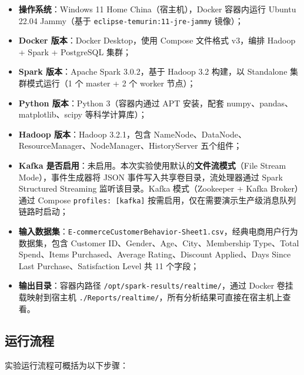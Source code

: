 \documentclass[12pt,hyperref,a4paper,UTF8]{ctexart}
\begin{document}
\begin{itemize}
    \item \textbf{操作系统}：Windows 11 Home China（宿主机），Docker 容器内运行 Ubuntu 22.04 Jammy（基于 \texttt{eclipse-temurin:11-jre-jammy} 镜像）；
    \item \textbf{Docker 版本}：Docker Desktop，使用 Compose 文件格式 v3，编排 Hadoop + Spark + PostgreSQL 集群；
    \item \textbf{Spark 版本}：Apache Spark 3.0.2，基于 Hadoop 3.2 构建，以 Standalone 集群模式运行（1 个 master + 2 个 worker 节点）；
    \item \textbf{Python 版本}：Python 3（容器内通过 APT 安装，配套 numpy、pandas、matplotlib、scipy 等科学计算库）；
    \item \textbf{Hadoop 版本}：Hadoop 3.2.1，包含 NameNode、DataNode、ResourceManager、NodeManager、HistoryServer 五个组件；
    \item \textbf{Kafka 是否启用}：未启用。本次实验使用默认的\textbf{文件流模式}（File Stream Mode），事件生成器将 JSON 事件写入共享卷目录，流处理器通过 Spark Structured Streaming 监听该目录。Kafka 模式（Zookeeper + Kafka Broker）通过 Compose \texttt{profiles: [kafka]} 按需启用，仅在需要演示生产级消息队列链路时启动；
    \item \textbf{输入数据集}：\texttt{E-commerceCustomerBehavior-Sheet1.csv}，经典电商用户行为数据集，包含 Customer ID、Gender、Age、City、Membership Type、Total Spend、Items Purchased、Average Rating、Discount Applied、Days Since Last Purchase、Satisfaction Level 共 11 个字段；
    \item \textbf{输出目录}：容器内路径 \texttt{/opt/spark-results/realtime/}，通过 Docker 卷挂载映射到宿主机 \texttt{./Reports/realtime/}，所有分析结果可直接在宿主机上查看。
\end{itemize}

\subsection{运行流程}

实验运行流程可概括为以下步骤：
\end{document}

